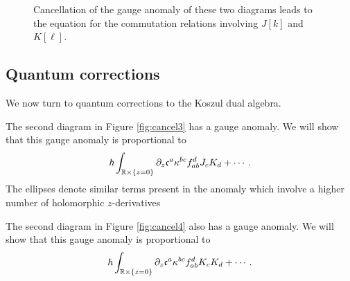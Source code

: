 \documentclass[11pt]{amsart}
\begin{document}
\begin{figure}
	\caption{Cancellation of the gauge anomaly of these two diagrams leads to the equation for the commutation relations involving $J[k]$ and $K[\ell]$.
	\label{fig:cancel2}}
\end{figure}

\subsection*{Quantum corrections}

We now turn to quantum corrections to the Koszul dual algebra.

The second diagram in Figure \ref{fig:cancel3} has a gauge anomaly.
We will show that this gauge anomaly is proportional to 
\[
\hbar \int_{\mathbb R \times \{z=0\}} \partial_z \mathfrak c^a \kappa^{bc} f_{ab}^d J_{c} K_{d} + \cdots .
\]
The ellipses denote similar terms present in the anomaly which involve a higher number of holomorphic $z$-derivatives 

The second diagram in Figure \ref{fig:cancel4} also has a gauge anomaly.
We will show that this gauge anomaly is proportional to 
\[
\hbar \int_{\mathbb R \times \{z=0\}} \partial_z \mathfrak c^a \kappa^{bc} f_{ab}^d K_{c} K_{d} + \cdots .
\]
\end{document}
